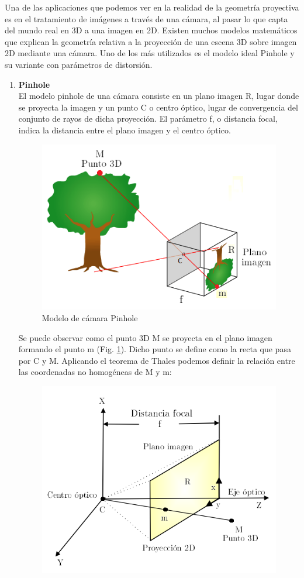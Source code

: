 \documentclass[a4,10pt]{article}
\begin{document}
Una de las aplicaciones que podemos ver en la realidad de la geometría proyectiva es en el tratamiento de imágenes a través de una cámara, al pasar lo que capta del mundo real en 3D a una imagen en 2D.
Existen muchos modelos matemáticos que explican la geometría relativa a la proyección de una escena 3D sobre imagen 2D mediante una cámara. Uno de los más utilizados es el modelo ideal Pinhole y su variante con parámetros de distorsión.
\begin{enumerate}

\item \textbf{Pinhole}\\
El modelo pinhole de una cámara consiste en un plano imagen R, lugar donde se proyecta la imagen y un punto C o centro óptico, lugar de convergencia del conjunto de rayos de dicha proyección. El parámetro f, o distancia focal, indica la distancia entre el plano imagen y el centro óptico.
\begin{figure}
\begin{center}
\includegraphics[width=0.6\linewidth]{images/pinhole}
\end{center}
\caption{Modelo de cámara Pinhole}
\label{fig:pinhole}
\end{figure}
Se puede observar como el punto 3D M se proyecta en el plano imagen formando el punto m (Fig. \ref{fig:pinhole}). Dicho punto se define como la recta que pasa por C y M. Aplicando el teorema de Thales podemos definir la relación entre las coordenadas no homogéneas de M y m:
\begin{figure}
\begin{center}
\includegraphics[width=0.7\linewidth]{images/pinholegeo}

\end{center}
\end{figure}
\end{enumerate}
\end{document}
